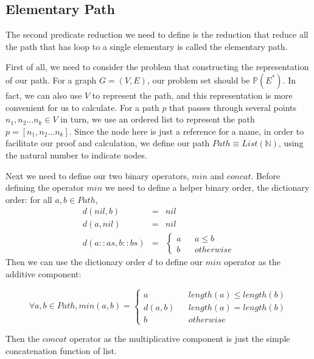 \documentclass[a4paper,10pt]{article}
\newcommand{\e}[2]{
\begin{equation}
  \label{#1} 
  #2
\end{equation}
}
\begin{document}
\subsection{Elementary Path}
The second predicate reduction we need to define is the reduction that reduce all the path that has loop to a single elementary is called the elementary path. 

First of all, we need to consider the problem that constructing the representation of our path. For a graph $G = (V,E)$, our problem set should be $\mathbb{P}(E^*)$. In fact, we can also use $V$ to represent the path, and this representation is more convenient for us to calculate. For a path $p$ that passes through several points $n_1,n_2 ... n_k \in V$ in turn, we use an ordered list to represent the path $p = [n_1,n_2 ... n_k]$. 
Since the node here is just a reference for a name, in order to facilitate our proof and calculation, we define our path $Path \equiv List(\mathbb{N})$, using the natural number to indicate nodes.

Next we need to define our two binary operators, $min$ and $concat$. 
Before defining the operator $min$ we need to define a helper binary order, the dictionary order: for all  $a,b \in Path$,
\[
\begin{array}{rcl} 
d(nil,b) & = & nil\\
d(a,nil) & = & nil\\
d(a::as,b::bs) & = & 
\left\{
\begin{aligned}
a &  & a \leq b \\
b &  & otherwise
\end{aligned}
\right.
\end{array}
\] 
Then we can use the dictionary order $d$ to define our $min$ operator as the additive component: 
\e{pf:def:elementary_path_min}{\forall a,b \in Path, min(a,b) = \left\{
\begin{aligned}
a &  & length(a) \leq length(b) \\
d(a,b) &  & length(a) = length(b) \\
b &  & otherwise 
\end{aligned}
\right.}
Then the $concat$ operator as the multiplicative component is just the simple concatenation function of list.
\end{document}
